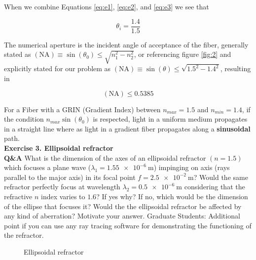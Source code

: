 \documentclass[main.tex]{subfiles}
\begin{document}
When we combine Equations \ref{eq:e1}, \ref{eq:e2}, and \ref{eq:e3} we see that 

\begin{equation}\label{eq:e3}
\theta_{i} = \frac{1.4}{1.5}
\end{equation}

The numerical aperture is the incident angle of acceptance of the fiber, generally stated as $(\text{NA}) \equiv \sin(\theta_0) \leq \sqrt{n_1^2 - n_2^2}$, or referencing figure \ref{fig:2} and explicitly stated for our problem as $(\text{NA}) \equiv \sin(\theta) \leq \sqrt{1.5^2 - 1.4^2}$, resulting in 

\begin{equation}\label{eq:2b}
(\text{NA}) \leq 0.5385
\end{equation}

For a Fiber with a GRIN (Gradient Index) between $n_{max} = 1.5$ and $n_{min} = 1.4$, if the condition $n_{max}\sin(\theta_0)$ is respected, light in a uniform medium propagates in a straight line where as light in a gradient fiber propagates along a \textbf{sinusoidal} path.\\

\textbf{Exercise 3. Ellipsoidal refractor}\\
\textbf{Q\&A} What is the dimension of the axes of an ellipsoidal refractor $(n=1.5)$ which focuses a plane wave ($\lambda_1 = \SI{1.55e-6}{\meter}$) impinging on axis (rays parallel to the major axis) in its focal point $f =  \SI{2.5e-2}{\meter}$? Would the same refractor perfectly focus at wavelength $\lambda_2 = \SI{0.5e-6}{\meter}$ considering that the refractive $n$ index varies to $1.6$? If yes why? If no, which would be the dimension of the ellipse that focuses it? Would the the ellipsoidal refractor be affected by any kind of aberration? Motivate your answer. Graduate Students: Additional point if you can use any ray tracing software for demonstrating the functioning of the refractor.\\

\begin{figure}
\centering{}
\caption{Ellipsoidal refractor}
\label{fig:3}
\end{figure}
\end{document}
